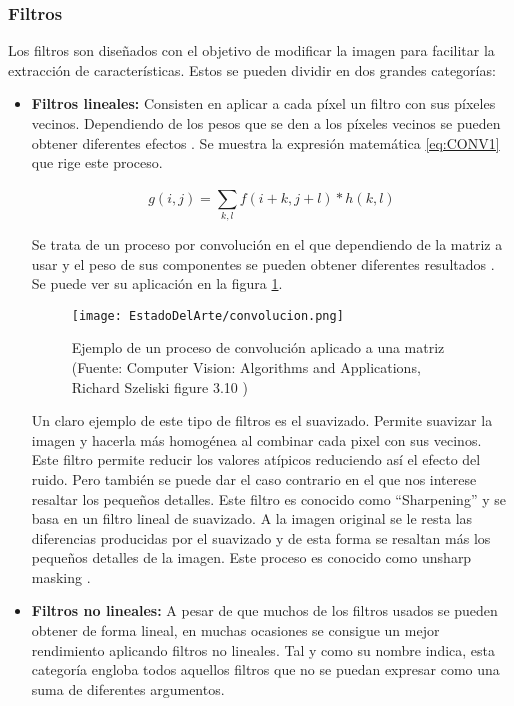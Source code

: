 \subsubsection*{Filtros}
Los filtros son diseñados con el objetivo de modificar la imagen para facilitar la extracción de características. Estos se pueden dividir en dos grandes categorías:

\begin{itemize}
\item \textbf{Filtros lineales:} Consisten en aplicar a cada píxel un filtro con sus píxeles vecinos. Dependiendo de los pesos que se den a los píxeles vecinos se pueden obtener diferentes efectos \cite{convolucion}. Se muestra la expresión matemática \ref{eq:CONV1} que rige este proceso.

\begin{equation}\label{eq:CONV1}
	g(i,j) =  \sum_{k,l}^{} f(i+k,j+l)*h(k,l)
\end{equation}
	
Se trata de un proceso por convolución en el que dependiendo de la matriz a usar y el peso de sus componentes se pueden obtener diferentes resultados \cite{convolucion}. Se puede ver su aplicación en la figura \ref{fig:CONV2}.

\begin{figure}[ht]
	\centering
	\texttt{[image: EstadoDelArte/convolucion.png]}
	\caption[Proceso de convolución en matrices]{Ejemplo de un proceso de convolución aplicado a una matriz (Fuente: Computer Vision: Algorithms and Applications, Richard Szeliski figure 3.10 \cite{szeliski})}
	\label{fig:CONV2}
	\vspace{-5pt}
\end{figure}

Un claro ejemplo de este tipo de filtros es el suavizado. Permite suavizar la imagen y hacerla más homogénea al combinar cada pixel con sus vecinos. Este filtro permite reducir los valores atípicos reduciendo así el efecto del ruido. Pero también se puede dar el caso contrario en el que nos interese resaltar los pequeños detalles. Este filtro es conocido como “Sharpening” y se basa en un filtro lineal de suavizado. A la imagen original se le resta las diferencias producidas por el suavizado y de esta forma se resaltan más los pequeños detalles de la imagen. Este proceso es conocido como unsharp masking \cite{szeliski}.

\item \textbf{Filtros no lineales:} A pesar de que muchos de los filtros usados se pueden obtener de forma lineal, en muchas ocasiones se consigue un mejor rendimiento aplicando filtros no lineales. Tal y como su nombre indica, esta categoría engloba todos aquellos filtros que no se puedan expresar como una suma de diferentes argumentos. 


\end{itemize}
